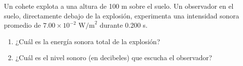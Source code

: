 \item Un cohete explota a una altura de 100 m sobre el suelo. Un observador en el suelo, directamente debajo de la explosión, experimenta una intensidad sonora promedio de $7.00 \times 10^{-2}\text{ W/m}^2$ durante 0.200 s.
\begin{enumerate}
    \item ¿Cuál es la energía sonora total de la explosión?
    \item ¿Cuál es el nivel sonoro (en decibeles) que escucha el observador?
\end{enumerate}